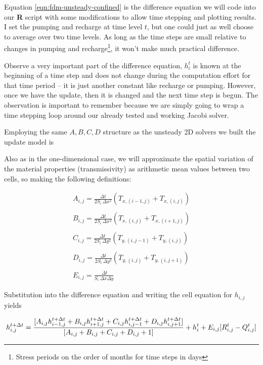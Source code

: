 Equation \ref{eqn:fdm-unsteady-confined} is the difference equation we will code into our \textbf{R} script with some modifications to allow time stepping and plotting results.
I set the pumping and recharge at time level $t$, but one could just as well choose to average over two time levels.
As long as the time steps are small relative to changes in pumping and recharge\footnote{Stress periods on the order of months for time steps in days}, it won't make much practical difference.

Observe a very important part of the difference equation, $h_i^{t}$ is known at the beginning of a time step and does not change during the computation effort for that time period -- it is just another constant like recharge or pumping.   
However, once we have the update, then it is changed and the next time step is begun.
The observation is important to remember because we are simply going to wrap a time stepping loop around our already tested and working Jacobi solver.

Employing the same $A,B,C,D$ structure as the unsteady 2D solvers we built the update model is

Also as in the one-dimensional case, we will approximate the spatial variation of the material properties (transmissivity) as arithmetic mean values between two cells, so making the following definitions:

\begin{equation}
\begin{matrix}
A_{i,j} = \frac{\Delta t}{2 S_i~\Delta x^2}(T_{x,(i-1,j)}+T_{x,(i,j)}) \\ ~~ \\
B_{i,j} = \frac{\Delta t}{2 S_i~\Delta x^2}(T_{x,(i,j)}+T_{x,(i+1,j)})   \\ ~~ \\
C_{i,j} = \frac{\Delta t}{2 S_i~\Delta y^2}(T_{y,(i,j-1)}+T_{y,(i,j)})   \\ ~~ \\
D_{i,j} = \frac{\Delta t}{2 S_i~\Delta y^2}(T_{y,(i,j)}+T_{y,(i,j+1)})   \\ ~~ \\
E_{i,j} = \frac{~\Delta t}{S_i~\Delta x \Delta y}
\end{matrix}
\end{equation}

Substitution into the difference equation and writing the cell equation for $h_{i,j}$ yields

\begin{equation}
h_{i,j}^{t+\Delta t} = \frac{[A_{i,j}h_{i-1,j}^{t+\Delta t} + B_{i,j}h_{i+1,j}^{t+\Delta t} + C_{i,j}h_{i,j-1}^{t+\Delta t} + D_{i,j}h_{i,j+1}^{t+\Delta t}]}{[A_{i,j}+B_{i,j}+C_{i,j}+D_{i,j}+1]}+h_{i}^{t}+E_{i,j}[R_{i,j}^{t}-Q_{i,j}^{t}]\\
\end{equation}

